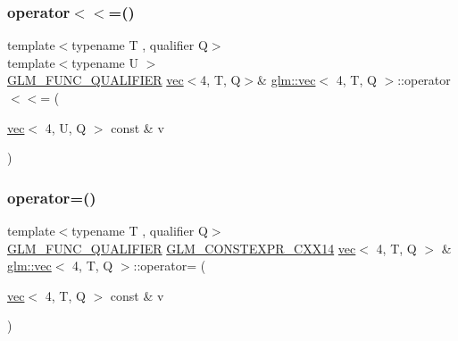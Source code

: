 \subsubsection{\texorpdfstring{operator$<$$<$=()}{operator<<=()}\hspace{0.1cm}{\footnotesize\ttfamily [6/6]}}
{\footnotesize\ttfamily template$<$typename T , qualifier Q$>$ \\
template$<$typename U $>$ \\
\hyperlink{setup_8hpp_a33fdea6f91c5f834105f7415e2a64407}{G\+L\+M\+\_\+\+F\+U\+N\+C\+\_\+\+Q\+U\+A\+L\+I\+F\+I\+ER} \hyperlink{structglm_1_1vec}{vec}$<$4, T, Q$>$\& \hyperlink{structglm_1_1vec}{glm\+::vec}$<$ 4, T, Q $>$\+::operator$<$$<$= (\begin{DoxyParamCaption}\item[{\hyperlink{structglm_1_1vec}{vec}$<$ 4, U, Q $>$ const \&}]{v }\end{DoxyParamCaption})}

\mbox{\label{structglm_1_1vec_3_014_00_01_t_00_01_q_01_4_aecb1fc48895abb231dc7bd64a941ec51}} 
\subsubsection{\texorpdfstring{operator=()}{operator=()}\hspace{0.1cm}{\footnotesize\ttfamily [1/3]}}
{\footnotesize\ttfamily template$<$typename T , qualifier Q$>$ \\
\hyperlink{setup_8hpp_a33fdea6f91c5f834105f7415e2a64407}{G\+L\+M\+\_\+\+F\+U\+N\+C\+\_\+\+Q\+U\+A\+L\+I\+F\+I\+ER} \hyperlink{setup_8hpp_a4dd12abf5e1164bc57f3a34671d03844}{G\+L\+M\+\_\+\+C\+O\+N\+S\+T\+E\+X\+P\+R\+\_\+\+C\+X\+X14} \hyperlink{structglm_1_1vec}{vec}$<$ 4, T, Q $>$ \& \hyperlink{structglm_1_1vec}{glm\+::vec}$<$ 4, T, Q $>$\+::operator= (\begin{DoxyParamCaption}\item[{\hyperlink{structglm_1_1vec}{vec}$<$ 4, T, Q $>$ const \&}]{v }\end{DoxyParamCaption})}

\mbox{\label{structglm_1_1vec_3_014_00_01_t_00_01_q_01_4_a48ac928cee66a63093353f54d915e223}} 
